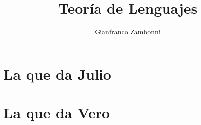 \documentclass[10pt,a4paper]{book}
\title{Teoría de Lenguajes}
\author{Gianfranco Zambonni}
\theoremstyle{definition}
\begin{document}
\maketitle
\tableofcontents
\newpage

\chapter{La que da Julio}

\newpage


\newpage


\newpage


\newpage


\newpage


\newpage


\newpage


\newpage
\chapter{La que da Vero}

\end{document}
